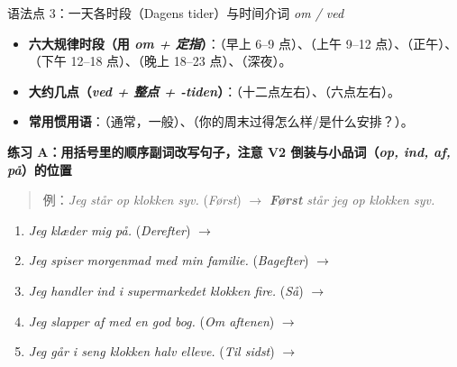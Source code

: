 \begin{grammatikbox}{语法点 3：一天各时段（Dagens tider）与时间介词 \textit{om / ved}}
\begin{itemize}
  \item \textbf{六大规律时段（用 \textit{om + 定指}）}：（早上 6--9 点）、（上午 9--12 点）、（正午）、（下午 12--18 点）、（晚上 18--23 点）、（深夜）。
  \item \textbf{大约几点（\textit{ved + 整点 + -tiden}）}：（十二点左右）、（六点左右）。
  \item \textbf{常用惯用语}：（通常，一般）、（你的周末过得怎么样/是什么安排？）。
\end{itemize}
\end{grammatikbox}


\textbf{练习 A：用括号里的顺序副词改写句子，注意 V2 倒装与小品词（\textit{op, ind, af, på}）的位置}
\begin{quote}
\small 例：\textit{Jeg står op klokken syv.} (\textit{Først}) $\rightarrow$ \textit{\textbf{Først} står jeg op klokken syv.}
\end{quote}
\begin{enumerate}
  \item \textit{Jeg klæder mig på.} (\textit{Derefter}) $\rightarrow$
  \item \textit{Jeg spiser morgenmad med min familie.} (\textit{Bagefter}) $\rightarrow$
  \item \textit{Jeg handler ind i supermarkedet klokken fire.} (\textit{Så}) $\rightarrow$
  \item \textit{Jeg slapper af med en god bog.} (\textit{Om aftenen}) $\rightarrow$
  \item \textit{Jeg går i seng klokken halv elleve.} (\textit{Til sidst}) $\rightarrow$
\end{enumerate}


